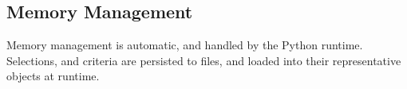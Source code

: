 \subsection{Memory Management}
Memory management is automatic, and handled by the Python runtime. Selections, and criteria are persisted to files, and loaded into their representative objects at runtime.